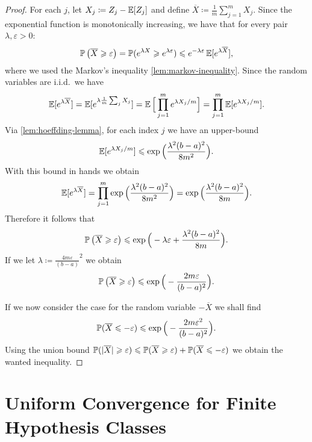 \begin{proof}
    For each \(j\), let \(X_j \coloneq Z_j - \operatorname{\mathbb{E}}[Z_j]\) and define
    \(\overline{X} \coloneq \frac{1}{m} \sum_{j=1}^m X_j\). Since the exponential
    function is monotonically increasing, we have that for every pair
    \(\lambda, \varepsilon > 0\):
    \[
        \operatorname{\mathbb{P}}\big( \overline{X} \geqslant \varepsilon \big)
        = \operatorname{\mathbb{P}}(e^{\lambda X} \geqslant e^{\lambda \varepsilon})
        \leqslant e^{-\lambda \varepsilon} \operatorname{\mathbb{E}}[e^{\lambda \overline X}],
    \]
    where we used the Markov's inequality \cref{lem:markov-inequality}. Since the
    random variables are i.i.d.~we have
    \[
        \operatorname{\mathbb{E}}[e^{\lambda \overline X}]
        = \operatorname{\mathbb{E}}[e^{\lambda \frac{1}{m} \sum_j X_j}]
        = \operatorname{\mathbb{E}}\Big[ \prod_{j=1}^m e^{\lambda X_j/m} \Big]
        = \prod_{j=1}^m \operatorname{\mathbb{E}}[e^{\lambda X_j/m}].
    \]
    Via \cref{lem:hoeffding-lemma}, for each index \(j\) we have an upper-bound
    \[
        \operatorname{\mathbb{E}}[e^{\lambda X_j/m}] \leqslant \exp\Big( \frac{\lambda^2 (b - a)^2}{8 m^2} \Big).
    \]
    With this bound in hands we obtain
    \[
        \operatorname{\mathbb{E}}[e^{\lambda \overline X}]
        = \prod_{j=1}^m \exp\Big( \frac{\lambda^2 (b - a)^2}{8 m^2} \Big)
        = \exp\Big( \frac{\lambda^2 (b - a)^2}{8 m} \Big).
    \]
    Therefore it follows that
    \[
        \operatorname{\mathbb{P}}\big( \overline X \geqslant \varepsilon \big)
        \leqslant \exp\Big(-\lambda \varepsilon + \frac{\lambda^2 (b - a)^2}{8 m} \Big).
    \]
    If we let \(\lambda \coloneq \frac{4 m \varepsilon}{(b-a)}^2\) we obtain
    \[
        \operatorname{\mathbb{P}}\big( \overline X \geqslant \varepsilon \big)
        \leqslant \exp\Big( -\frac{2 m \varepsilon}{(b - a)^2} \Big).
    \]

    If we now consider the case for the random variable \(-\overline{X}\) we shall
    find
    \[
        \operatorname{\mathbb{P}}(\overline X \leqslant -\varepsilon)
        \leqslant \exp\Big( -\frac{2 m \varepsilon^{2}}{(b-a)^2} \Big).
    \]
    Using the union bound
    \(\operatorname{\mathbb{P}}(|\overline X| \geqslant \varepsilon) \leqslant \operatorname{\mathbb{P}}(\overline X \geqslant \varepsilon)
    + \operatorname{\mathbb{P}}(\overline X \leqslant - \varepsilon)\) we obtain the wanted inequality.
\end{proof}

\section{Uniform Convergence for Finite Hypothesis Classes}

